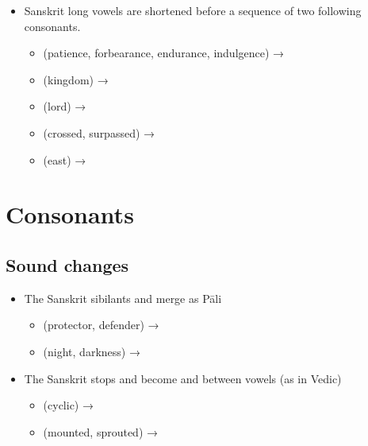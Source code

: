 \begin{itemize}
\begin{itemize}
			\item {} (vision, sight) → 
			\item {} (growth, increase) → 
			\item {} (straight) → 
			\item {} (touched) → 
			\item {} (old) → 
		\end{itemize}
	\item Sanskrit long vowels are shortened before a sequence of two following consonants.
		\begin{itemize}
			\item {} (patience, forbearance, endurance, indulgence) → 
			\item {} (kingdom) → 
			\item {} (lord) → 
			\item {} (crossed, surpassed) → 
			\item {} (east) → 
		\end{itemize}
\end{itemize}

\section{Consonants}

\subsection{Sound changes}

\begin{itemize}
	\item The Sanskrit sibilants  and  merge as Pāli 
		\begin{itemize}
			\item {} (protector, defender) → 
			\item {} (night, darkness) → 
		\end{itemize}
	\item The Sanskrit stops  and  become  and  between vowels (as in Vedic)
		\begin{itemize}
			\item {} (cyclic) → 
			\item {} (mounted, sprouted) → 
		\end{itemize}
\end{itemize}

